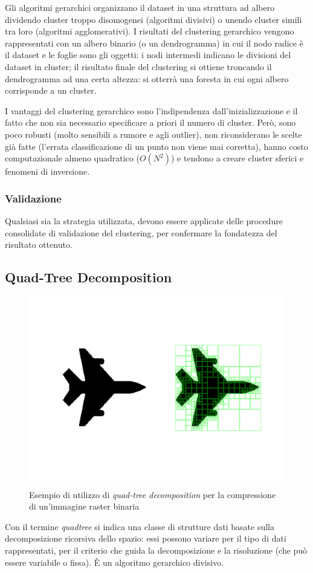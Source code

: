 \documentclass[\main/main.tex]{subfiles}
\begin{document}
Gli algoritmi gerarchici organizzano il dataset in una struttura ad albero dividendo cluster troppo disomogenei (algoritmi divisivi) o unendo cluster simili tra loro (algoritmi agglomerativi). I risultati del clustering gerarchico vengono rappresentati con un albero binario (o un dendrogramma) in cui il nodo radice è il dataset e le foglie sono gli oggetti: i nodi intermedi indicano le divisioni del dataset in cluster; il risultato finale del clustering si ottiene troncando il dendrogramma ad una certa altezza: si otterrà una foresta in cui ogni albero corrisponde a un cluster.

I vantaggi del clustering gerarchico sono l'indipendenza dall'inizializzazione e il fatto che non sia necessario specificare a priori il numero di cluster. Però, sono poco robusti (molto sensibili a rumore e agli outlier), non riconsiderano le scelte già fatte (l'errata classificazione di un punto non viene mai corretta), hanno costo computazionale almeno quadratico ($O(N^2)$) e tendono a creare cluster sferici e fenomeni di inversione.

\subsubsection{Validazione}
Qualsiasi sia la strategia utilizzata, devono essere applicate delle procedure consolidate di validazione del clustering, per confermare la fondatezza del risultato ottenuto.

\subsection{Quad-Tree Decomposition}
\begin{figure} \centering
	\caption{Esempio di utilizzo di \textit{quad-tree decomposition} per la compressione di un'immagine raster binaria}
	\label{fig:qtdecomp}

	\includegraphics[width=\textwidth,trim={1.25in 2.5in 1.25in 2.5in},clip]{../images/qtdecomp.pdf}
\end{figure}
Con il termine \textit{quadtree} si indica una classe di strutture dati basate sulla decomposizione ricorsiva dello spazio: essi possono variare per il tipo di dati rappresentati, per il criterio che guida la decomposizione e la risoluzione (che può essere variabile o fissa). È un algoritmo gerarchico divisivo.
\end{document}
